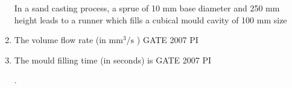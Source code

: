 \documentclass[journal,12pt,onecolumn]{IEEEtran}
\theoremstyle{remark}
\begin{document}
\begin{enumerate}
 In a sand casting process, a sprue of 10 mm base diameter and 250 mm height leads to a runner which fills a cubical mould cavity of 100 mm size\\
 
 
\item 
The volume flow rate (in $\mathrm{mm}^3/\mathrm{s}$
)
\hfill{GATE 2007 PI}
\begin{enumerate}
\end{enumerate}

\item 
The mould filling time (in seconds) is
\hfill{GATE 2007 PI}
\begin{enumerate}
\end{enumerate}


.
   





\end{enumerate}
\end{document}
